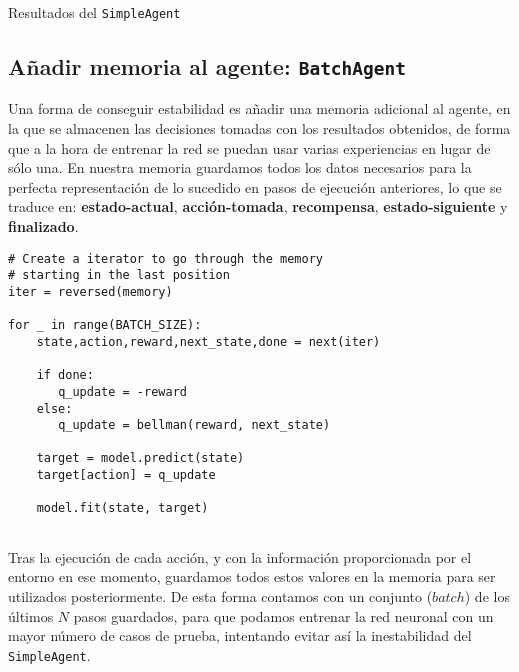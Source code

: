 %
       {Resultados del \texttt{SimpleAgent}}

\subsection{Añadir memoria al agente: \texttt{BatchAgent}}
\label{sec:cartpoledqn2}

Una forma de conseguir estabilidad es añadir una memoria adicional al agente, en la que se almacenen las decisiones tomadas con los resultados obtenidos, de forma que a la hora de entrenar la red se puedan usar varias experiencias en lugar de sólo una. 
En nuestra memoria guardamos todos los datos necesarios para la perfecta representación de lo sucedido en pasos de ejecución anteriores, lo que se traduce en: \textbf{estado-actual}, \textbf{acción-tomada}, \textbf{recompensa}, \textbf{estado-siguiente} y \textbf{finalizado}.

\begin{minipage}{0.9\linewidth}%
\begin{lstlisting}[frame=tb, caption=Pseudocódigo función Replay de BatchAgent, label=code:cartpole_drl2]
# Create a iterator to go through the memory 
# starting in the last position 
iter = reversed(memory)

for _ in range(BATCH_SIZE):
    state,action,reward,next_state,done = next(iter)

    if done:
       q_update = -reward
    else:
       q_update = bellman(reward, next_state)

    target = model.predict(state)
    target[action] = q_update

    model.fit(state, target)
              
\end{lstlisting}%
\end{minipage}

Tras la ejecución de cada acción, y con la información proporcionada por el entorno en ese momento, guardamos todos estos valores en la memoria para ser utilizados posteriormente. De esta forma contamos con un conjunto ($batch$) de los últimos $N$ pasos guardados, para que podamos entrenar la red neuronal con un mayor número de casos de prueba, intentando evitar así la inestabilidad del \texttt{SimpleAgent}.


